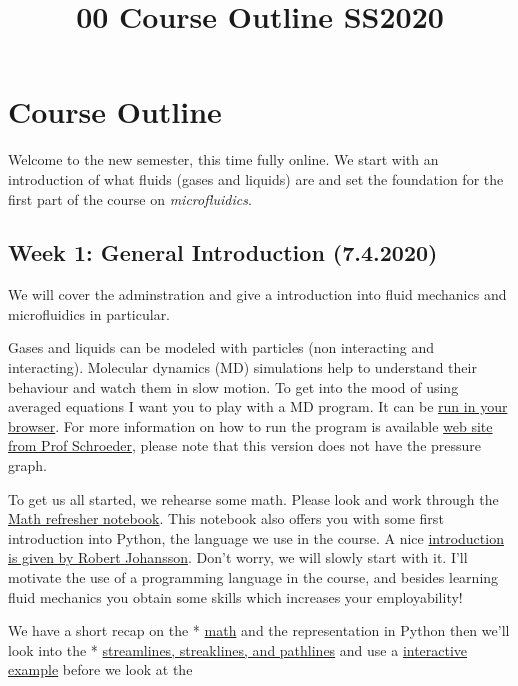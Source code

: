 \documentclass[11pt]{article}
\title{00 Course Outline SS2020}
\begin{document}
    
    
    \maketitle
    
    

    
    \section{Course Outline}\label{course-outline}

Welcome to the new semester, this time fully online. We start with an
introduction of what fluids (gases and liquids) are and set the
foundation for the first part of the course on \emph{microfluidics}.

\subsection{Week 1: General Introduction
(7.4.2020)}\label{week-1-general-introduction-7.4.2020}

We will cover the adminstration and give a introduction into fluid
mechanics and microfluidics in particular.

Gases and liquids can be modeled with particles (non interacting and
interacting). Molecular dynamics (MD) simulations help to understand
their behaviour and watch them in slow motion. To get into the mood of
using averaged equations I want you to play with a MD program. It can be
\href{http://cav2012.sg/cdohl/ph3501/md/}{run in your browser}. For more
information on how to run the program is available
\href{http://physics.weber.edu/schroeder/md/}{web site from Prof
Schroeder}, please note that this version does not have the pressure
graph.

To get us all started, we rehearse some math. Please look and work
through the
\href{01\%20Math\%20Refresher\%20and\%20Python\%20Introduction.ipynb}{Math
refresher notebook}. This notebook also offers you with some first
introduction into Python, the language we use in the course. A nice
\href{http://nbviewer.jupyter.org/github/jrjohansson/scientific-python-lectures/blob/master/Lecture-1-Introduction-to-Python-Programming.ipynb}{introduction
is given by Robert Johansson}. Don't worry, we will slowly start with
it. I'll motivate the use of a programming language in the course, and
besides learning fluid mechanics you obtain some skills which increases
your employability!

We have a short recap on the *
\href{01\%20Math\%20Refresher\%20and\%20Python\%20Introduction.ipynb}{math}
and the representation in Python then we'll look into the *
\href{02\%20Streamlines,\%20Pathlines,\%20Streaklines.ipynb}{streamlines,
streaklines, and pathlines} and use a
\href{Example\%20of\%20Stream-Streak-Pathlines.ipynb}{interactive
example} before we look at the
\end{document}
